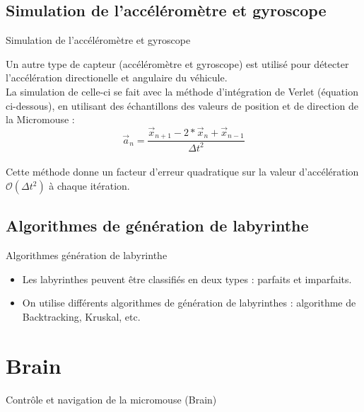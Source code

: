 \documentclass{beamer}
\begin{document}
\subsection{Simulation de l'accéléromètre et gyroscope}
\begin{frame}{Simulation de l'accéléromètre et gyroscope}

Un autre type de capteur (accéléromètre et gyroscope) est utilisé pour détecter l'accélération directionelle et angulaire du véhicule. \\


\vspace{5mm}
La simulation de celle-ci se fait avec la méthode d'intégration de Verlet (équation ci-dessous), en utilisant des échantillons des valeurs de position et de direction de la Micromouse : \\
\begin{equation*}
    \vec{a}_n = \frac{\vec{x}_{n+1} - 2 * \vec{x}_n + \vec{x}_{n-1}}{\Delta t^2}
\end{equation*}\\
Cette méthode donne un facteur d'erreur quadratique sur la valeur d'accélération $\mathcal{O}(\Delta t^2)$ à chaque itération.
\end{frame}

\subsection{Algorithmes de génération de labyrinthe}


\begin{frame}{Algorithmes génération de labyrinthe}
\begin{itemize}
\item Les labyrinthes peuvent être classifiés en deux types :   parfaits et imparfaits.
\item On utilise différents algorithmes de génération de labyrinthes : algorithme de Backtracking, Kruskal, etc.

\end{itemize}
\end{frame}


\section{Brain}
\begin{frame}{Contrôle et navigation de la micromouse (Brain)}


\end{frame}
\end{document}
